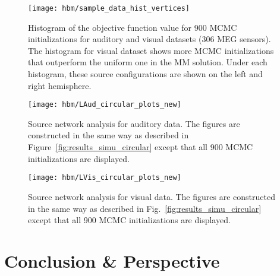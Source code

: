 \begin{figure}[htp]
	\centering
	\texttt{[image: hbm/sample\_data\_hist\_vertices]}%
	\caption{Histogram of the objective function value for 900 MCMC initializations for auditory and visual datasets (306 MEG sensors). The histogram for visual dataset shows more MCMC initializations that outperform the uniform one in the MM solution. Under each histogram, these source configurations are shown on the left and right hemisphere.
	}
	\label{fig:hist_real_datasets}
\end{figure}



\begin{figure}[htp]
	\centering
	\texttt{[image: hbm/LAud\_circular\_plots\_new]}%
	\caption{Source network analysis for auditory data. The figures are constructed in the same way as described in Figure~\ref{fig:results_simu_circular} except that all 900 MCMC initializations are displayed.}
	\label{fig:circular_plots_LAud}
\end{figure}



\begin{figure}[htp]
	\centering
	\texttt{[image: hbm/LVis\_circular\_plots\_new]}%
	\caption{Source network analysis for visual data. The figures are constructed in the same way as described in Fig.~\ref{fig:results_simu_circular} except that all 900 MCMC initializations are displayed.}
	\label{fig:circular_plots_LVis}
\end{figure}

\section{Conclusion \& Perspective}
\label{sec:Dis}

